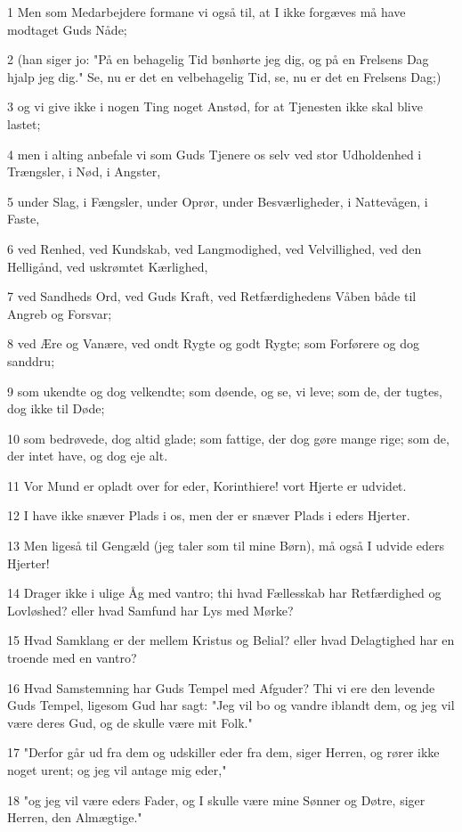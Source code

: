 \par 1 Men som Medarbejdere formane vi også til, at I ikke forgæves må have modtaget Guds Nåde;
\par 2 (han siger jo: "På en behagelig Tid bønhørte jeg dig, og på en Frelsens Dag hjalp jeg dig." Se, nu er det en velbehagelig Tid, se, nu er det en Frelsens Dag;)
\par 3 og vi give ikke i nogen Ting noget Anstød, for at Tjenesten ikke skal blive lastet;
\par 4 men i alting anbefale vi som Guds Tjenere os selv ved stor Udholdenhed i Trængsler, i Nød, i Angster,
\par 5 under Slag, i Fængsler, under Oprør, under Besværligheder, i Nattevågen, i Faste,
\par 6 ved Renhed, ved Kundskab, ved Langmodighed, ved Velvillighed, ved den Helligånd, ved uskrømtet Kærlighed,
\par 7 ved Sandheds Ord, ved Guds Kraft, ved Retfærdighedens Våben både til Angreb og Forsvar;
\par 8 ved Ære og Vanære, ved ondt Rygte og godt Rygte; som Forførere og dog sanddru;
\par 9 som ukendte og dog velkendte; som døende, og se, vi leve; som de, der tugtes, dog ikke til Døde;
\par 10 som bedrøvede, dog altid glade; som fattige, der dog gøre mange rige; som de, der intet have, og dog eje alt.
\par 11 Vor Mund er opladt over for eder, Korinthiere! vort Hjerte er udvidet.
\par 12 I have ikke snæver Plads i os, men der er snæver Plads i eders Hjerter.
\par 13 Men ligeså til Gengæld (jeg taler som til mine Børn), må også I udvide eders Hjerter!
\par 14 Drager ikke i ulige Åg med vantro; thi hvad Fællesskab har Retfærdighed og Lovløshed? eller hvad Samfund har Lys med Mørke?
\par 15 Hvad Samklang er der mellem Kristus og Belial? eller hvad Delagtighed har en troende med en vantro?
\par 16 Hvad Samstemning har Guds Tempel med Afguder? Thi vi ere den levende Guds Tempel, ligesom Gud har sagt: "Jeg vil bo og vandre iblandt dem, og jeg vil være deres Gud, og de skulle være mit Folk."
\par 17 "Derfor går ud fra dem og udskiller eder fra dem, siger Herren, og rører ikke noget urent; og jeg vil antage mig eder,"
\par 18 "og jeg vil være eders Fader, og I skulle være mine Sønner og Døtre, siger Herren, den Almægtige."

